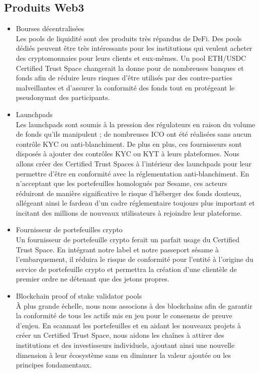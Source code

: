 ﻿\documentclass[a4paper]{article}
\let\OldTexttrademark\texttrademark
\renewcommand{\texttrademark}{\OldTexttrademark\xspace}%
\newcommand{\smallvspace}{\vspace{4pt} \\}
\begin{document}
\subsection{Produits Web3}
\begin{itemize} 
\item Bourses décentralisées \smallvspace
Les pools de liquidité sont des produits très répandus de DeFi. Des pools dédiés peuvent être très intéressants pour les institutions qui veulent acheter des cryptomonnaies pour leurs clients et eux-mêmes. Un pool ETH/USDC Certified Trust Space\texttrademark changerait la donne pour de nombreuses banques et fonds afin de réduire leurs risques d'être utilisés par des contre-parties malveillantes et d'assurer la conformité des fonds tout en protégeant le pseudonymat des participants. 

\item 
Launchpads \smallvspace
Les launchpads sont soumis à la pression des régulateurs en raison du volume de fonds qu'ils manipulent ; de nombreuses ICO ont été réalisées sans aucun contrôle KYC ou anti-blanchiment. De plus en plus, ces fournisseurs sont disposés à ajouter des contrôles KYC ou KYT à leurs plateformes. Nous allons créer des Certified Trust Spaces\texttrademark à l'intérieur des launchpads pour leur permettre d'être en conformité avec la réglementation anti-blanchiment. En n'acceptant que les portefeuilles homologués par Sesame, ces acteurs réduiront de manière significative le risque d'héberger des fonds douteux, allégeant ainsi le fardeau d'un cadre réglementaire toujours plus important et incitant des millions de nouveaux utilisateurs à rejoindre leur plateforme.

\item 
Fournisseur de portefeuilles crypto \smallvspace
Un fournisseur de portefeuille crypto ferait un parfait usage du Certified Trust Space\OldTexttrademark. En intégrant notre label et notre passeport sésame à l'embarquement, il réduira le risque de conformité pour l'entité à l'origine du service de portefeuille crypto et permettra la création d'une clientèle de premier ordre ne détenant que des jetons propres.

\item 
Blockchain proof of stake validator pools \smallvspace
À plus grande échelle, nous nous associons à des blockchains afin de garantir la conformité de tous les actifs mis en jeu pour le consensus de preuve d'enjeu. En scannant les portefeuilles et en aidant les nouveaux projets à créer un Certified Trust Space\OldTexttrademark, nous aidons les chaînes à attirer des institutions et des investisseurs individuels, ajoutant ainsi une nouvelle dimension à leur écosystème sans en diminuer la valeur ajoutée ou les principes fondamentaux.


\end{itemize}
\end{document}
